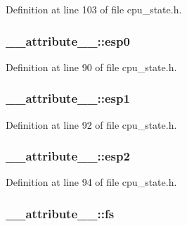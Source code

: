 \-Definition at line 103 of file cpu\-\_\-state.\-h.

\hypertarget{struct____attribute_____a389f5ac73704f3b0e3846233a4f47254}{
\subsubsection[{esp0}]{ {\bf \-\_\-\-\_\-attribute\-\_\-\-\_\-\-::esp0}}}\label{struct____attribute_____a389f5ac73704f3b0e3846233a4f47254}


\-Definition at line 90 of file cpu\-\_\-state.\-h.

\hypertarget{struct____attribute_____a64c26f988bfeab4e7bca5f117eb2fa95}{
\subsubsection[{esp1}]{ {\bf \-\_\-\-\_\-attribute\-\_\-\-\_\-\-::esp1}}}\label{struct____attribute_____a64c26f988bfeab4e7bca5f117eb2fa95}


\-Definition at line 92 of file cpu\-\_\-state.\-h.

\hypertarget{struct____attribute_____a38cd3845ab6e82d14cbab6cf4ba16831}{
\subsubsection[{esp2}]{ {\bf \-\_\-\-\_\-attribute\-\_\-\-\_\-\-::esp2}}}\label{struct____attribute_____a38cd3845ab6e82d14cbab6cf4ba16831}


\-Definition at line 94 of file cpu\-\_\-state.\-h.

\hypertarget{struct____attribute_____a13d48d00591967720c0b23cf524fc5a3}{
\subsubsection[{fs}]{ {\bf \-\_\-\-\_\-attribute\-\_\-\-\_\-\-::fs}}}\label{struct____attribute_____a13d48d00591967720c0b23cf524fc5a3}


